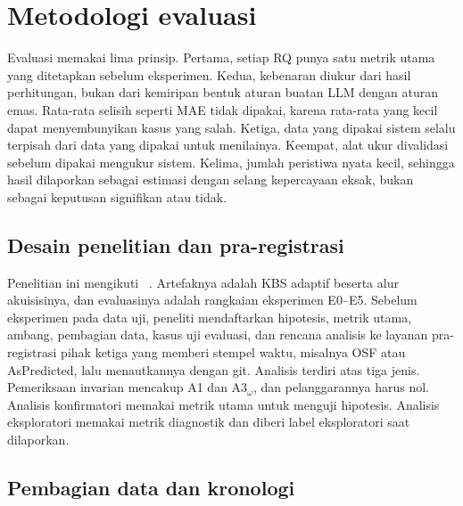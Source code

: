 \section{Metodologi evaluasi}
\label{sec:evaluasi}

Evaluasi memakai lima prinsip. Pertama, setiap RQ punya satu metrik utama yang ditetapkan sebelum eksperimen. Kedua, kebenaran diukur dari hasil perhitungan, bukan dari kemiripan bentuk aturan buatan LLM dengan aturan emas. Rata-rata selisih seperti MAE tidak dipakai, karena rata-rata yang kecil dapat menyembunyikan kasus yang salah. Ketiga, data yang dipakai sistem selalu terpisah dari data yang dipakai untuk menilainya. Keempat, alat ukur divalidasi sebelum dipakai mengukur sistem. Kelima, jumlah peristiwa nyata kecil, sehingga hasil dilaporkan sebagai estimasi dengan selang kepercayaan eksak, bukan sebagai keputusan signifikan atau tidak.


\subsection{Desain penelitian dan pra-registrasi}
\label{subsec:desain}

Penelitian ini mengikuti ~\cite{hevner2004design,peffers2007design}. Artefaknya adalah KBS adaptif beserta alur akuisisinya, dan evaluasinya adalah rangkaian eksperimen E0--E5. Sebelum eksperimen pada data uji, peneliti mendaftarkan hipotesis, metrik utama, ambang, pembagian data, kasus uji evaluasi, dan rencana analisis ke layanan pra-registrasi pihak ketiga yang memberi stempel waktu, misalnya OSF atau AsPredicted, lalu menautkannya dengan  git. Analisis terdiri atas tiga jenis. Pemeriksaan invarian mencakup A1 dan A3$_\omega$, dan pelanggarannya harus nol. Analisis konfirmatori memakai metrik utama untuk menguji hipotesis. Analisis eksploratori memakai metrik diagnostik dan diberi label eksploratori saat dilaporkan.

\subsection{Pembagian data dan kronologi}
\label{subsec:pembagian}

